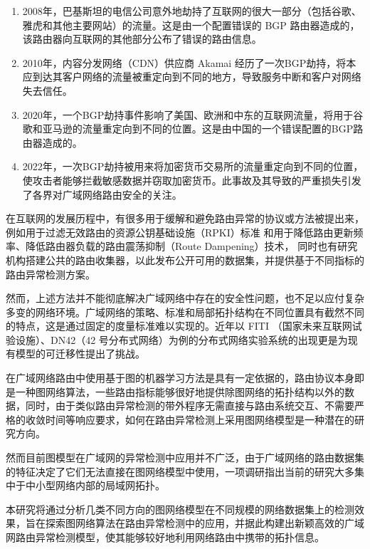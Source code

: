 \begin{enumerate}
    \item 2008年，巴基斯坦的电信公司意外地劫持了互联网的很大一部分（包括谷歌、雅虎和其他主要网站）的流量。这是由一个配置错误的 BGP 路由器造成的，该路由器向互联网的其他部分公布了错误的路由信息。
    \item 2010年，内容分发网络（CDN）供应商 Akamai 经历了一次BGP劫持，将本应到达其客户网络的流量被重定向到不同的地方，导致服务中断和客户对网络失去信任。
    \item 2020年，一个BGP劫持事件影响了美国、欧洲和中东的互联网流量，将用于谷歌和亚马逊的流量重定向到不同的位置。这是由中国的一个错误配置的BGP路由器造成的。
    \item 2022年，一次BGP劫持被用来将加密货币交易所的流量重定向到不同的位置，使攻击者能够拦截敏感数据并窃取加密货币。此事故及其导致的严重损失引发了各界对广域网络路由安全的关注。
\end{enumerate}

在互联网的发展历程中，有很多用于缓解和避免路由异常的协议或方法被提出来，例如用于过滤无效路由的资源公钥基础设施（RPKI）标准  和用于降低路由更新频率、降低路由器负载的路由震荡抑制（Route Dampening）技术， 同时也有研究机构搭建公共的路由收集器，以此发布公开可用的数据集，并提供基于不同指标的路由异常检测方案。

然而，上述方法并不能彻底解决广域网络中存在的安全性问题，也不足以应付复杂多变的网络环境。广域网络的策略、标准和局部拓扑结构在不同位置具有截然不同的特点，这是通过固定的度量标准难以实现的。近年以 FITI （国家未来互联网试验设施）、DN42（42 号分布式网络）为例的分布式网络实验系统的出现更是为现有模型的可迁移性提出了挑战。

在广域网络路由中使用基于图的机器学习方法是具有一定依据的，路由协议本身即是一种图网络算法，一些路由指标能够很好地提供除图网络的拓扑结构以外的数据，同时，由于类似路由异常检测的带外程序无需直接与路由系统交互、不需要严格的收敛时间等响应要求，如何在路由异常检测上采用图网络模型是一种潜在的研究方向。

然而目前图模型在广域网的异常检测中应用并不广泛，由于广域网络的路由数据集的特征决定了它们无法直接在图网络模型中使用，一项调研指出当前的研究大多集中于中小型网络内部的局域网拓扑。

本研究将通过分析几类不同方向的图网络模型在不同规模的网络数据集上的检测效果，旨在探索图网络算法在路由异常检测中的应用，并据此构建出新颖高效的广域网路由异常检测模型，使其能够较好地利用网络路由中携带的拓扑信息。
